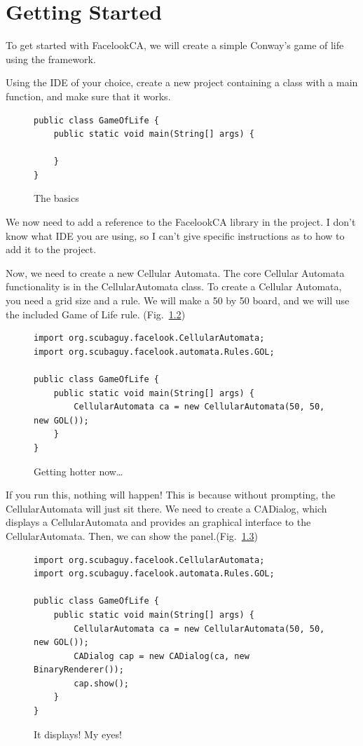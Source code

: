 \documentclass{report}
\begin{document}
\chapter{Getting Started}
To get started with FacelookCA, we will create a simple Conway's game of life
using the framework.


Using the IDE of your choice, create a new project containing a class with a
main function, and make sure that it
works.
\begin{figure}[H]
\begin{lstlisting}
public class GameOfLife {
    public static void main(String[] args) {

    }
}
\end{lstlisting}
\caption{The basics}
\label{code:start}
\end{figure}


We now need to add a reference to the FacelookCA library in the project. I don't
know what IDE you are using, so I can't give specific instructions as to how to
add it to the project. 


Now, we need to create a new Cellular Automata. The core Cellular Automata
functionality is in the CellularAutomata class. To create a Cellular Automata,
you need a grid size and a rule. We will make a 50 by 50 board, and we will use
the included Game of Life rule. (Fig.~\ref{code:caStart})
\begin{figure}[H]
\begin{lstlisting}
import org.scubaguy.facelook.CellularAutomata;
import org.scubaguy.facelook.automata.Rules.GOL;

public class GameOfLife {
    public static void main(String[] args) {
        CellularAutomata ca = new CellularAutomata(50, 50, new GOL());
    }
}
\end{lstlisting}
\caption{Getting hotter now\ldots}
\label{code:caStart}
\end{figure}


If you run this, nothing will happen! This is because without prompting, the
CellularAutomata will just sit there. We need to create a CADialog, which
displays a CellularAutomata and provides an graphical interface to the
CellularAutomata. Then, we can show the panel.(Fig.~\ref{code:show})
\begin{figure}[H]
\begin{lstlisting}
import org.scubaguy.facelook.CellularAutomata;
import org.scubaguy.facelook.automata.Rules.GOL;

public class GameOfLife {
    public static void main(String[] args) {
        CellularAutomata ca = new CellularAutomata(50, 50, new GOL());
        CADialog cap = new CADialog(ca, new BinaryRenderer());
        cap.show();
    }
}
\end{lstlisting}
\caption{It displays! My eyes!}
\label{code:show}
\end{figure}
\end{document}
